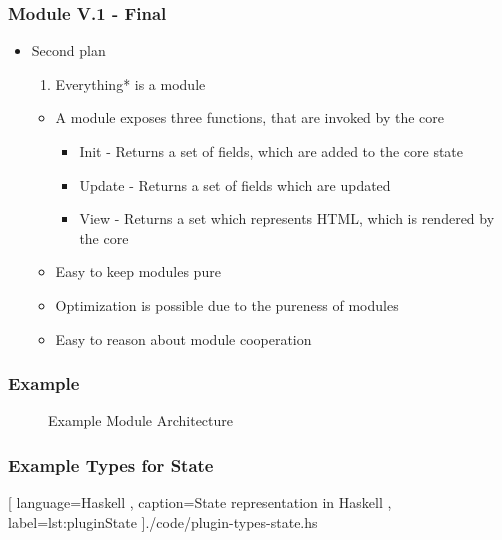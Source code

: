 \begin{frame}
  \frametitle{Module V.1 - Final}
  \begin{itemize}
    \item Second plan
      \pause
      \begin{enumerate}
        \item Everything* is a module
      \end{enumerate}
      \pause
      \begin{itemize}
        \item A module exposes three functions, that are invoked by the core
          \pause
          \begin{itemize}
            \item Init - Returns a set of fields, which are added to the core state
              \pause
            \item Update - Returns a set of fields which are updated
              \pause
            \item View - Returns a set which represents HTML, which is rendered by
              the core
          \end{itemize}
          \pause
        \item Easy to keep modules pure
          \pause
        \item Optimization is possible due to the pureness of modules
          \pause
        \item Easy to reason about module cooperation
      \end{itemize}
  \end{itemize}
\end{frame}

\hidelogo
\begin{frame}
  \frametitle{Example}
  \begin{figure}
    \centering
    
    \caption{Example Module Architecture}
    \label{fig:moduleArchitecture}
  \end{figure}
\end{frame}

\showlogo
\begin{frame}
  \frametitle{Example Types for State}
    \begin{center}
      
      [ language=Haskell
      , caption={State representation in Haskell}
      , label=lst:pluginState
      ]{./code/plugin-types-state.hs}
    \end{center}
\end{frame}

